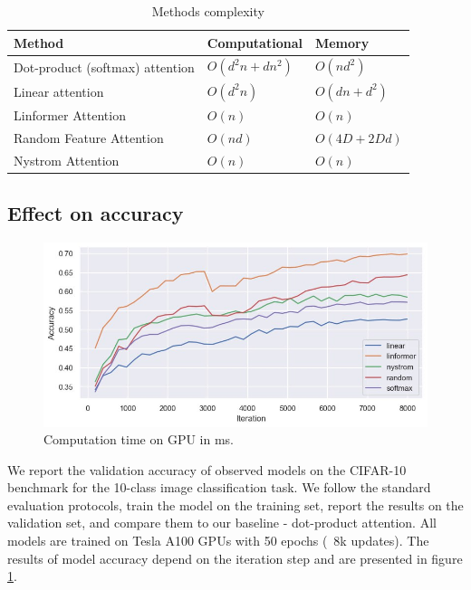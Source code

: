 \begin{table}
\centering
\begin{tabular}{l|l|l}
Method & Computational & Memory & \\\hline
Dot-product (softmax) attention & $O(d^2n+dn^2)$ &  $O(nd^2)$ \\
Linear attention & $O(d^2n)$ & $ O(dn+d^2) $  \\
Linformer Attention & $O(n)$ & $ O(n) $ \\
Random Feature Attention & $O(nd)$ & $O(4D + 2Dd)$ \\
Nystrom Attention & $O(n)$ & $O(n)$
\end{tabular}
\caption{\label{tab:mem-complexity}Methods complexity}
\end{table}


\subsection{Effect on accuracy}

\begin{figure}[!h]
	\centering
	\includegraphics[scale=0.5]{attention-accuracy.jpg}
	\caption{Computation time on GPU in ms.}
	\label{fig:attention-accuracy}
\end{figure}

We report the validation accuracy of observed models on the CIFAR-10 \cite{cifar-10}  benchmark for the 10-class image classification task. We follow the standard evaluation protocols, train the model on the training set, report the results on the validation set, and compare them to our baseline - dot-product attention. All models are trained on Tesla A100 GPUs with 50 epochs (~8k updates). The results of model accuracy depend on the iteration step and are presented in figure \ref{fig:attention-accuracy}.

